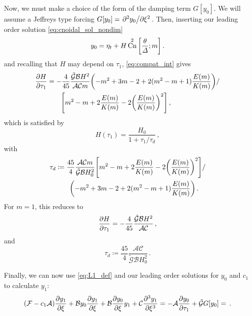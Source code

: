\documentclass{jfm}
\DeclareMathOperator{\cn}{Cn}
\begin{document}
Now, we must make a choice of the form of the damping term $G[y_0]$.
We will assume a Jeffreys type forcing $G[y_0] = \pdv*[2]{y_0}{\xi}$.
Then, inserting our leading order solution \cref{eq:cnoidal_sol_nondim}
\begin{equation}
  y_0 = \eta_t + H \cn^2\bqty{\frac{\theta}{\Delta}; m} \,.
\end{equation}
and recalling that $H$ may depend on $\tau_1$, \cref{eq:compat_int} gives
\begin{equation}
  \begin{split}
    \pdv{H}{\tau_1} &= -\frac{4}{45} \frac{\mathcal{\tilde{G}} \mathcal{B}
      H^2}{\mathcal{A} \mathcal{C} m}
      \pqty{-m^2 +3m -2 +2(m^2-m+1) \frac{E(m)}{K(m)}}
      / \\
    &\qquad \bqty{m^2 -m +2\frac{E(m)}{K(m)} -2\pqty{\frac{E(m)}{K(m)}}^2}
      \,,
  \end{split}
\end{equation}
which is satisfied by
\begin{equation}
  H(\tau_1) = \frac{H_0}{1 + \tau_1/\tau_d} \,,
\end{equation}
with
\begin{equation}
  \begin{split}
    \tau_d &\coloneqq \frac{45}{4} \frac{\mathcal{A}
      \mathcal{C} m}{\mathcal{\tilde{G}} \mathcal{B} H_0^2}
      \bqty{m^2-m+2 \frac{E(m)}{K(m)}-2 \pqty{\frac{E(m)}{K(m)}}^2}
      / \\
    &\qquad \pqty{-m^2+3 m-2+2 (m^2-m+1) \frac{E(m)}{K(m)}}
      \,.
  \end{split}
\end{equation}
For $m=1$, this reduces to
\begin{equation}
  \pdv{H}{\tau_1} = -\frac{4}{45} \frac{\mathcal{\tilde{G}} \mathcal{B}
    H^2}{\mathcal{A} \mathcal{C}}
    \,,
\end{equation}
and
\begin{equation}
  \tau_d \coloneqq \frac{45}{4} \frac{\mathcal{A}
    \mathcal{C}}{\mathcal{\tilde{G}} \mathcal{B} H_0^2} \,.
\end{equation}

Finally, we can now use \cref{eq:L1_def} and our leading order solutions
for $y_0$ and $c_1$ to calculate $y_1$:
\begin{equation}
  \pqty{\mathcal{F} -c_1 \mathcal{A}} \pdv{y_1}{\xi}
    + \mathcal{B} y_0 \pdv{y_1}{\xi}
    + \mathcal{B} \pdv{y_0}{\xi} y_1
    + \mathcal{C} \pdv[3]{y_1}{\xi}
  = - \mathcal{A} \pdv{y_0}{\tau_1}
    + \mathcal{\tilde{G}} G[y_0]
  = \,.
  \label{eq:kdv_inhom}
\end{equation}
\end{document}
